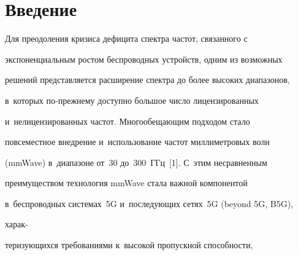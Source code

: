   

















 \thispagestyle{headings}


 


 \vspace*{-12pt}


  


  \section{Введение}


  


  Для преодоления кризиса дефицита спектра частот, связанного с 


экспоненциальным ростом беспроводных устройств, одним из возможных 


решений представляется расширение спектра до более высоких диапазонов, 


в~которых по-прежнему доступно большое число лицензированных 


и~нелицензированных час\-тот. Многообещающим подходом стало 


повсеместное внедрение и~использование час\-тот миллиметровых волн 


(mmWave) в~диапазоне от~30 до~300~ГГц~[1]. С~этим несравненным 


преимуществом технология mmWave стала важной компонентой 


в~беспроводных системах~5G и~последующих сетях~5G (beyond 5G, B5G), 


харак-\linebreak\vspace*{-12pt}





\noindent


теризующихся требованиями к~высокой пропускной способности, 


